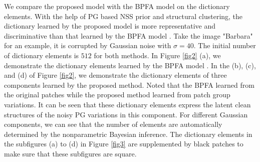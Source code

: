 \documentclass[runningheads]{llncs}
\begin{document}
We compare the proposed model with the BPFA model on the dictionary elements. With the help of PG based NSS prior and structural clustering, the dictionary learned by the proposed model is more representative and discriminative than that learned by the BPFA model \cite{bpfa}. Take the image "Barbara" for an example, it is corrupted by Gaussian noise with $\sigma = 40$. The initial number of dictionary elements is $512$ for both methods. In Figure \ref{fig2} (a), we demonstrate the dictionary elements learned by the BPFA model \cite{bpfa}. In the (b), (c), and (d) of Figure \ref{fig2}, we demonstrate the dictionary elements of three components learned by the proposed method. Noted that the BPFA learned from the original patches while the proposed method learned from patch group variations. It can be seen that these dictionary elements express the latent clean structures of the noisy PG variations in this component. For different Gaussian components, we can see that the number of elements are automatically determined by the nonparametric Bayesian inference. The dictionary elements in the subfigures (a) to (d) in Figure \ref{fig3} are supplemented by black patches to make sure that these subfigures are square.
\vspace{-0.2in}
\end{document}
